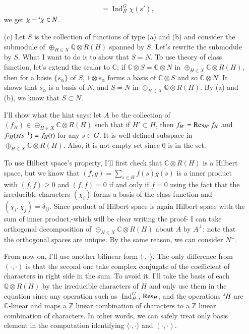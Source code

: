 \documentclass[a4paper, 12pt]{article}
\theoremstyle{Mydefinition}
\theoremstyle{Mytheorem}
\DeclareMathOperator{\Ind}{Ind}
\begin{document}
\begin{enumerate}
\begin{equation}
\begin{split}
        &=\Ind_H^G \chi(s'),
    \end{split}
    \end{equation}
    we get $\chi-\prescript{s}{\phantom{1}}{\chi}\in N$.
    \item[(c)] Let $S$ is the collection of functions of type (a) and (b) and consider the submodule of $\oplus_{H\in X}\mathbb{Q}\otimes R(H)$ spanned by $S$. Let's rewrite the submodule by $S$. What I want to do is to show that $S = N$. To use theory of class function, let's extend the scalar to $\mathbb{C}$; if $\mathbb{C}\otimes S = \mathbb{C}\otimes N$ in $\oplus_{H\in X}\mathbb{C}\otimes R(H)$, then for a basis $\{s_\alpha\}$ of $S$, $1\otimes s_\alpha$ forms a basis of $\mathbb{C}\otimes S$ and so $\mathbb{C}\otimes N$. It shows that $s_\alpha$ is a basis of $N$, and $S=N$ in $\oplus_{H\in X}\mathbb{Q}\otimes R(H)$. By (a) and (b), we know that $S\subset N$.
    
    I'll show what the hint says: let $A$ be the collection of $(f_H)\in \oplus_{H\in X}\mathbb{C}\otimes R(H)$ such that if $H'\subset H$, then $f_{H'} = \Res_{H'} f_H$ and $f_{\prescript{s}{\phantom{s}}{H}}(sts^{-1}) = f_{H}(t)$ for any $s\in G$. It is well-defined subspace in $\oplus_{H\in X}\mathbb{C}\otimes R(H)$. Also, it is not empty set since $0$ is in the set. 
    
    To use Hilbert space's property, I'll first check that $\mathbb{C}\otimes R(H)$ is a Hilbert space, but we know that $(f ,g) = \sum_{s\in H}f(s)\overline{g(s)}$ is a inner product with $(f,f)\geq 0$ and $(f,f)=0$ if and only if $f=0$ using the fact that the irreducible characters $(\chi_i)$ forms a basis of the class function and $(\chi_i,\chi_j) = \delta_{ij}$. Since product of Hilbert space is again Hilbert space with the sum of inner product,-which will be clear writing the proof- I can take orthogonal decomposition of $\oplus_{H\in X}\mathbb{C}\otimes R(H)$ about $A$ by $A^\perp$; note that the orthogonal spaces are unique. By the same reason, we can consider $N^\perp$.
    
    From now on, I'll use another bilinear form $\langle\cdot, \cdot\rangle$. The only difference from $(\cdot,\cdot)$ is that the second one take complex conjugate of the coefficient of characters in right side in the sum. To avoid it, I'll take the basis of each $\mathbb{Q}\otimes R(H)$ by the irreducible characters of $H$ and only use them in the equation since any operation such as $\Ind_H^G$, $\Res_H$, and the operations $\prescript{s}{\phantom{s}}{H}$ are $\mathbb{C}$-linear and maps a $\mathbb{Z}$ linear combination of characters to a $\mathbb{Z}$ linear combination of characters. In other words, we can safely treat only basis element in the computation identifying $\langle\cdot, \cdot\rangle$ and $(\cdot,\cdot)$.
    

\end{enumerate}
\end{document}
